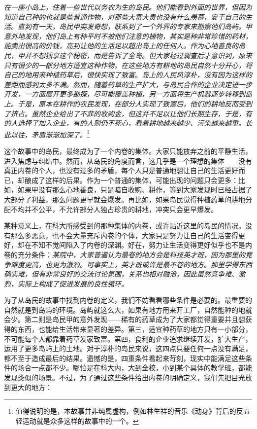 \documentclass[UTF8,a4paper,fontset=windows,11pt,openany]{ctexbook}
\begin{document}
\emph{在一座小岛上，住着一些世代以务农为生的岛民。他们能看到外面的世界，但因为知道自己种的也就是些普通作物，对那些大富大贵也没有什么羡慕，安于自己的生活。直到有一天，岛民甲突发奇想，联系到了一个外界的专家来勘察他们岛屿。甲意外地发现，他们岛上有种平时不被他们注意的植物，其实是种非常珍惜的药材，能卖出很高的价钱，高到让他的生活足以超出岛上的任何人。作为心地善良的岛民，甲并不想独享这个秘密，而是告诉了全岛。但大家经过调查后才意识到，原来只有很少的一部分地方适宜这种作物。在这些地方有耕地的岛民自然十分开心，将自己的地用来种植药草后，很快实现了致富。岛上的人民风淳朴，没有因为这样的差距而感到太多不满。然而，随着药草的生产扩大，与岛民合作的企业决定进一步开发，一方面展开更多勘探，尽可能覆盖种植，另一方面将生产机器逐步转移到岛上。于是，原本在耕作的农民发现，在部分人实现了致富后，他们的耕地反而受到了挤占。虽然企业给出了不菲的收购金，但这并不足以让他们长期生存，于是，有的人选择了加入企业，有的人则仍不死心，看着耕地越来越少、污染越来越重。长此以往，矛盾渐渐加深了。}\footnote{值得说明的是，本故事并非纯属虚构，例如林生祥的音乐《动身》背后的反五轻运动就是众多这样的故事中的一个。}

这个故事中的岛民，最终成为了一个内卷的集体。大家只能放弃之前的平静生活，进入焦虑与纠结中。然而，从岛民的角度而言，这几乎是一个理想的集体——没有真正内卷的个人，也没有过多的矛盾，每个人只是普通地想让自己的生活更好而已，却酿成了这样的后果。作为一个普通的集体，可能出现的问题只会更多：比如，如果甲没有那么心地善良，只是暗自收购、耕作，等到大家发现时已经占据了大部分了利益，那么问题更早就会爆发。再比如，如果岛民觉得种植药草的耕地分配不均并不公平，不允许部分人独占珍贵的耕地，冲突只会更早爆发。

某种意义上，在科大所感受到的那种集体的内卷，或许贴近这里的岛民的情况。没有那么多恶意，也不会大量充斥内卷的个体，大家只是努力让自己的生活变得更好，却在不知不觉间陷入了内卷的深渊。好在，努力让生活变得更好似乎也不是内卷的充分条件：\emph{某院中，大家普遍认为最卷的地方会是科技英才班，因为那里的竞争难度更高，也更为激烈。可事实上，英才班或许是最不卷的地方。那里学得东西确实难，但有非常良好的交流讨论氛围，关系也相对融洽，因此虽然竞争难、激烈，实际上构成了促进发展的良性循环。}

为了从岛民的故事中找到内卷的定义，我们不妨看看哪些条件是必要的。最重要的自然就是到岛屿的环境。岛屿就这么大，如果有地方用来开工厂，自然能种的地就会少。第二则是岛民甲的意外发现——稀有的药草成为了大家都觉得重要并且想获得的东西，也能给生活带来显著的差异。第三，适宜种药草的地方只有一小部分，不可能每个人都靠着药草发家致富。第四，食利的企业追求继续开发，扩大生产，运用了更多岛屿上的土地。对于淳朴的岛民来说，这四点只要任何一点没有满足，都不至于造成最后的结果。遗憾的是，四重条件看起来苛刻，现实中能满足这些条件的场合一点都不少。哪怕是在科大内，大到全校，小到某个具体的教学班，都能发现类似的场景。不过，为了通过这些条件给出内卷的明确定义，我们先把目光放到更大的地方：
\end{document}
